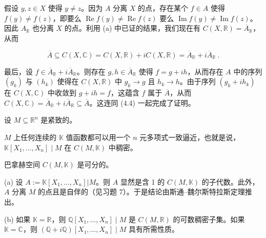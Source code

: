 \begin{theorem}
\begin{subitems}
假设 $y, z \in X$ 使得 $y \neq z$。因为 $A$ 分离 $X$ 的点，存在某个 $f \in A$ 使得 $f(y) \neq f(z)$，即要么 $\operatorname{Re} f(y) \neq \operatorname{Re} f(z)$ 要么 $\operatorname{Im} f(y) \neq \operatorname{Im} f(z)$。因此 $A_{\mathbb{R}}$ 也分离 $X$ 的点。利用 (a) 中已证的结果，我们现在有 $C(X, \mathbb{R}) = \overline{A}_{\mathbb{R}}$，从而

\begin{equation}
\overline{{A}}\subseteq C(X,\mathbb{C})=C(X,\mathbb{R})+i C(X,\mathbb{R})=\overline{{A}}_{\mathbb{R}}+i\overline{{A}}_{\mathbb{R}}~.
\end{equation}
\item

最后，设  $ f \in \overline{A}_{\mathbb{R}} + i\overline{A}_{\mathbb{R}} $。则存在  $ g, h \in \overline{A}_{\mathbb{R}} $ 使得  $ f = g + ih $，从而存在  $ A $ 中的序列  $ (g_k) $ 与  $ (h_k) $ 使得在  $ C(X, \mathbb{R}) $ 中  $ g_k \to g $ 且  $ h_k \to h $。由于序列  $ (g_k + ih_k) $ 在  $ C(X, \mathbb{C}) $ 中收敛到  $ g + ih = f $，这蕴含  $ f $ 属于  $ \overline{A} $，从而  $ C(X, \mathbb{C}) = \overline{A}_{\mathbb{R}} + i\overline{A}_{\mathbb{R}} \subseteq \overline{A} $。这连同 (4.4) 一起完成了证明。

\end{subitems}

\end{theorem}

\begin{corollary}

设  $ M \subseteq \mathbb{R}^n $ 是紧致的。

\begin{items}
\item

$M$ 上任何连续的  $\mathbb{K}$ 值函数都可以用一个  $n$ 元多项式一致逼近，也就是说， $\mathbb{K}[X_1, \ldots, X_n] \mid M$ 在  $C(M, \mathbb{K})$ 中稠密。

\item

巴拿赫空间  $C(M, \mathbb{K})$ 是可分的。

\proofhead
(a) 设  $A := \mathbb{K}[X_1, \ldots, X_n] | M$。则  $A$ 显然是含 1 的  $C(M, \mathbb{K})$ 的子代数。此外， $A$ 分离  $M$ 的点且是自伴的（见习题 7）。于是结论由斯通–魏尔斯特拉斯定理推出。
\end{items}

(b) 如果  $\mathbb{K} = \mathbb{R}$，则  $\mathbb{Q}[X_1, \ldots, X_n] \mid M$ 是  $C(M, \mathbb{R})$ 的可数稠密子集。如果  $\mathbb{K} = \mathbb{C}$，则  $(\mathbb{Q} + i\mathbb{Q})[X_1, \ldots, X_n] \mid M$ 具有所需性质。

\end{corollary}

